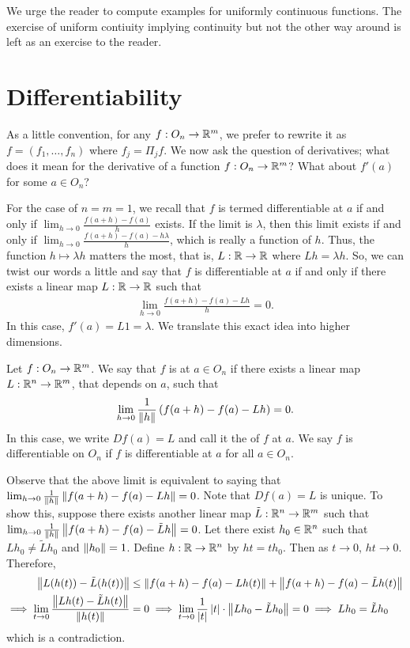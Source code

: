We urge the reader to compute examples for uniformly continuous functions. The exercise of uniform contiuity implying continuity but not the other way around is left as an exercise to the reader.

\section{Differentiability}

As a little convention, for any $f:O_{n} \to \mathbb{R}^{m}$, we prefer to rewrite it as $f = (f_{1},\ldots,f_{n})$ where $f_{j} = \Pi_{j} f$. We now ask the question of derivatives; what does it mean for the derivative of a function $f:O_{n} \to \mathbb{R}^{m}$? What about $f'(a)$ for some $a \in O_{n}$?

For the case of $n=m=1$, we recall that $f$ is termed differentiable at $a$ if and only if $\lim_{h \to 0} \frac{f(a+h)-f(a)}{h}$ exists. If the limit is $\lambda$, then this limit exists if and only if $\lim_{h \to 0} \frac{f(a+h)-f(a)-h\lambda}{h}$, which is really a function of $h$. Thus, the function $h \mapsto \lambda h$ matters the most, that is, $L:\mathbb{R} \to \mathbb{R}$ where $Lh = \lambda h$. So, we can twist our words a little and say that $f$ is differentiable at $a$ if and only if there exists a linear map $L:\mathbb{R} \to \mathbb{R}$ such that 
\begin{align}
    \lim_{h \to 0} \frac{f(a+h) - f(a) - Lh}{h} = 0.
\end{align}
In this case, $f'(a) = L1 = \lambda$. We translate this exact idea into higher dimensions.

\begin{definition}
    Let $f:O_{n} \to \mathbb{R}^{m}$. We say that $f$ is  at $a \in O_{n}$ if there exists a linear map $L:\mathbb{R}^{n} \to \mathbb{R}^{m}$, that depends on $a$, such that
    \begin{align}
        \lim_{h \to 0} \frac{1}{\left\lVert h\right\rVert}\left( f(a+h) - f(a) - Lh \right) = 0.
    \end{align}
    In this case, we write $Df(a) = L$ and call it the  of $f$ at $a$. We say $f$ is differentiable on $O_{n}$ if $f$ is differentiable at $a$ for all $a \in O_{n}$.
\end{definition}
Observe that the above limit is equivalent to saying that $\lim_{h \to 0} \frac{1}{\left\lVert h\right\rVert}\left\lVert f(a+h)-f(a)-Lh\right\rVert = 0$. Note that $Df(a) = L$ is unique. To show this, suppose there exists another linear map $\tilde{L}:\mathbb{R}^{n} \to \mathbb{R}^{m}$ such that $\lim_{h \to 0} \frac{1}{\left\lVert h\right\rVert} \left\lVert f(a+h)-f(a)-\tilde{L}h\right\rVert = 0$. Let there exist $h_{0} \in \mathbb{R}^{n}$ such that $Lh_{0} \neq \tilde{L}h_{0}$ and $\left\lVert h_{0}\right\rVert = 1$. Define $h:\mathbb{R}\to\mathbb{R}^{n}$ by $ht = th_{0}$. Then as $t \to 0$, $ht \to 0$. Therefore,
\begin{align}
    \left\lVert L(h(t))-\tilde{L}(h(t))\right\rVert &\leq \left\lVert f(a+h)-f(a)-Lh(t)\right\rVert + \left\lVert f(a+h)-f(a)-\tilde{L}h(t)\right\rVert \\
    \implies \lim_{t \to 0} \frac{\left\lVert Lh(t) - \tilde{L}h(t)\right\rVert}{\left\lVert h(t)\right\rVert} &= 0 \implies \lim_{t \to 0} \frac{1}{\left| t \right|} \left| t \right| \cdot \left\lVert Lh_{0}-\tilde{L}h_{0}\right\rVert = 0 \implies Lh_{0} = \tilde{L}h_{0}
\end{align}
which is a contradiction.

